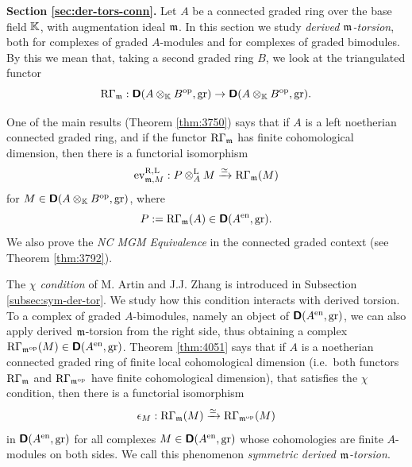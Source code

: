 \medskip \noindent 
{\bf Section \ref{sec:der-tors-conn}.}
Let $A$ be a connected graded ring over the base field $\mathbb{K}$, with augmentation 
ideal $\mathfrak{m}$. In this section we study {\em derived 
$\mathfrak{m}$-torsion}, both for complexes of graded $A$-modules and for complexes of 
graded bimodules. By this we mean that, taking a second graded ring $B$, we 
look at the triangulated functor 
\[ \mathrm{R} \Gamma_{\mathfrak{m}} : \boldsymbol{\mathsf{D}}(A \otimes_{\mathbb{K}} B^{\mathrm{op}}, \mathrm{gr}) \to
\boldsymbol{\mathsf{D}}(A \otimes_{\mathbb{K}} B^{\mathrm{op}}, \mathrm{gr}) .  \]

One of the main results (Theorem \ref{thm:3750}) says that if $A$ is 
a left noetherian connected graded ring, and if the functor 
$\mathrm{R} \Gamma_{\mathfrak{m}}$ has finite cohomological dimension, then there is a 
functorial isomorphism 
\begin{equation} \label{eqn:5016}
\operatorname{ev}^{\mathrm{R, L}}_{\mathfrak{m}, M} : 
P \otimes^{\mathrm{L}}_{A} M \xrightarrow{\simeq} \mathrm{R} \Gamma_{\mathfrak{m}}(M)  
\end{equation}
for $M \in \boldsymbol{\mathsf{D}}(A \otimes_{\mathbb{K}} B^{\mathrm{op}}, \mathrm{gr})$,
where
\begin{equation} \label{eqn:4620}
P := \mathrm{R} \Gamma_{\mathfrak{m}}(A) \in \boldsymbol{\mathsf{D}}(A^{\mathrm{en}}, \mathrm{gr}) . 
\end{equation}
We also prove the {\em NC MGM Equivalence} in the connected graded context (see 
Theorem \ref{thm:3792}).

The {\em $\chi$ condition} of M. Artin and J.J. Zhang is introduced in 
Subsection \ref{subsec:sym-der-tor}. We study how this condition 
interacts with derived torsion.
To a complex of graded $A$-bimodules, namely an object of 
$\boldsymbol{\mathsf{D}}(A^{\mathrm{en}}, \mathrm{gr})$, we can also apply derived $\mathfrak{m}$-torsion from 
the right side, thus obtaining a complex 
$\mathrm{R} \Gamma_{\mathfrak{m}^{\mathrm{op}}}(M) \in \boldsymbol{\mathsf{D}}(A^{\mathrm{en}}, \mathrm{gr})$. 
Theorem \ref{thm:4051} says that if $A$ is a 
noetherian connected graded ring of finite local cohomological dimension (i.e.\ 
both functors $\mathrm{R} \Gamma_{\mathfrak{m}}$ and $\mathrm{R} \Gamma_{\mathfrak{m}^{\mathrm{op}}}$ have finite 
cohomological dimension), that satisfies the $\chi$ condition, then there is a 
functorial isomorphism 
\begin{equation} \label{eqn:5017}
\epsilon_M : \mathrm{R} \Gamma_{\mathfrak{m}}(M) \xrightarrow{\simeq} \mathrm{R} \Gamma_{\mathfrak{m}^{\mathrm{op}}}(M) 
\end{equation}
in $\boldsymbol{\mathsf{D}}(A^{\mathrm{en}}, \mathrm{gr})$ for all complexes 
$M \in \boldsymbol{\mathsf{D}}(A^{\mathrm{en}}, \mathrm{gr})$ whose cohomologies 
are finite $A$-modules on both sides. We call this phenomenon {\em symmetric 
derived $\mathfrak{m}$-torsion}. 


